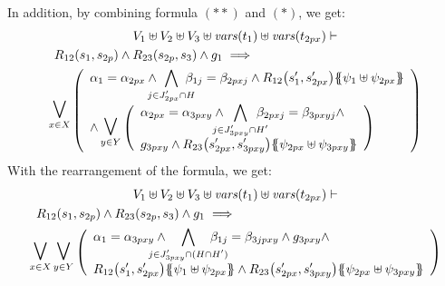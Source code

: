 \documentclass[runningheads]{llncs}
\begin{document}
\begin{enumerate}
In addition, by combining  formula $(**)$ and $(*)$, we get: 
\begin{multline*}
V_1 \uplus V_2 \uplus V_3  \uplus \fvars{t_1}\uplus \fvars{t_{2px}} \vdash\\
R_{12}\mpar{s_1, s_{2p}} \wedge R_{23}\mpar{s_{2p},s_3} \wedge g_1 \implies \hspace{4.5cm}\\\operatorname*{\bigsymb{\bigvee}}_{x \in X} \mpar{\everymath{\displaystyle}
\begin{array}{l}
			\alpha_1 = \alpha_{2px} \wedge \bigwedge_\subbox{j \in J'_{2px} \cap H} \beta_{1j} = \beta_{2pxj}  \wedge R_{12}\mpar{s'_1, s'_{2px}}\psubst{\psi_1 \uplus \psi_{2px}} \\ 
\land
		\operatorname*{\bigsymb{\bigvee}}_{y \in Y} \mpar{\everymath{\displaystyle}
\begin{array}{l}
			 \alpha_{2px}=\alpha_{3pxy} \wedge \bigwedge_\subbox{j \in J'_{3pxy} \cap H'} \beta_{2pxj}=\beta_{3pxyj} \nwedge\\
			 g_{3pxy} \wedge R_{23}\mpar{s'_{2px}, s'_{3pxy}}\psubst{\psi_{2px} \uplus \psi_{3pxy}}
		\end{array}}	
		\end{array}} 
\end{multline*}		
With  the rearrangement of the formula, we get:
\begin{multline*}
V_1 \uplus V_2 \uplus V_3  \uplus \fvars{t_1}\uplus \fvars{t_{2px}}  \vdash\\
R_{12}\mpar{s_1, s_{2p}} \wedge R_{23}\mpar{s_{2p},s_3} \wedge g_1 \implies 
\hspace{5.5cm}\\
\operatorname*{\bigsymb{\bigvee}}_{x \in X} 
\operatorname*{\bigsymb{\bigvee}}_{y \in Y}
\mpar{\everymath{\displaystyle}
\begin{array}{l}
\alpha_1=\alpha_{3pxy}\wedge \bigwedge_\subbox{j \in J'_{3pxy} \cap (H\cap H')} \beta_{1j}=\beta_{3jpxy} \wedge g_{3pxy}\wedge \\
R_{12}\mpar{s'_1, s'_{2px}}\psubst{\psi_1 \uplus \psi_{2px}} \wedge R_{23}\mpar{s'_{2px}, s'_{3pxy}}\psubst{\psi_{2px} \uplus \psi_{3pxy}}
\end{array}}
\end{multline*}	


\end{enumerate}
\end{document}
